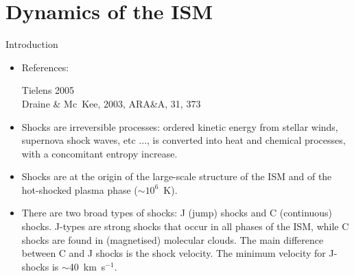 
\addtocounter{part}{4}

\part{Dynamics of the ISM}
\begin{frame}
  \partpage
  \tableofcontents[part=5]
\end{frame}








\begin{frame}{Introduction}




\begin{itemize}

\item References: 

Tielens 2005\\ Draine \& Mc~Kee, 2003, ARA\&A, 31, 373 \\

\item Shocks are irreversible processes: ordered kinetic energy from
  stellar winds, supernova shock waves, etc ..., is converted into
  heat and chemical processes, with a concomitant entropy increase.

\item Shocks are at the origin of the large-scale structure of the ISM
  and of the hot-shocked plasma phase ($\sim 10^{6}$~K). 

\item There are two broad types of shocks: J (jump) shocks and C
(continuous) shocks. J-types are strong shocks that occur in all
phases of the ISM, while C shocks are found in (magnetised) molecular
clouds. The main difference between C and J shocks is the shock
velocity. The minimum velocity for J-shocks is $\sim$40~km~s$^{-1}$.

\end{itemize}

\end{frame}


